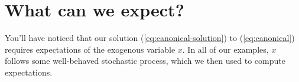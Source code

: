 \documentclass[11pt]{article}
\begin{document}
\begin{comment}
Adam asked how we compute expectations of future (say) dividends in forward-looking models.  In all of our examples, dividends follow some stationary process, which we then used to compute expectations.

Is that reasonable?  I'd say sometimes yes, sometimes no.  What do we do if it's not?  Hard to say.  Here's Robert Lucas on a similar issue, the impact of monetary policy:

Page 199:
I take the purpose of this session to be to elicit views on economic
policy from economists of different points of view. The title
of the session, “Macroeconomic Policy, 1974/75 : What Should Have
Been Done?” does not seem to me useful for this purpose.

What he means, I think, is that we need to know more about future policy to be able to assess the impact of current policy.  How much more?

Page 205:
[O]ur ability as economists to predict the responses of
agents rests, in situations where expectations about the future matter,
on our understanding of the stochastic environment agents believe themselves
to be operating in. In practice, this limits the class of policies the
consequences of which we can hope to assess in advance to policies
generated by fixed, well understood, relatively permanent rules (or functions
relating policy actions taken to the state of the economy).

That is:  without some "understanding of the stochastic environment" it's impossible to say what agents should expect, and therefore impossible to say what the impact will be.

Here's the whole thing:  http://www.nber.org/chapters/c6264.pdf
\end{comment}


\section{What can we expect?}

You'll have noticed that our solution (\ref{eq:canonical-solution})
to (\ref{eq:canonical}) requires expectations of the exogenous variable $x$.  
In all of our examples, $x$ follows some well-behaved stochastic process, which we then used to compute expectations.
\end{document}
